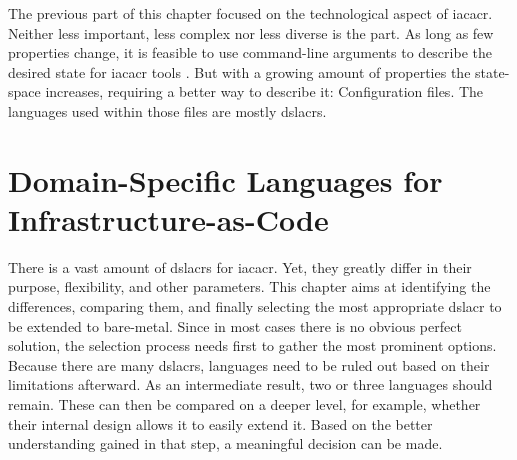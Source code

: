 \newline\smallskip
The previous part of this chapter focused on the technological  aspect of \gls{iacacr}. Neither less important, less complex nor less diverse is the  part.
\newline
As long as few properties change, it is feasible to use command-line arguments to describe the desired state for \gls{iacacr} tools \cite{iac_oreilly}. But with a growing amount of properties the state-space increases, requiring a better way to describe it: Configuration files. The languages used within those files are mostly \gls{dslacr}s.

\section{Domain-Specific Languages for Infrastructure-as-Code}
There is a vast amount of \gls{dslacr}s for \gls{iacacr}. Yet, they greatly differ in their purpose, flexibility, and other parameters. This chapter aims at identifying the differences, comparing them, and finally selecting the most appropriate \gls{dslacr} to be extended to bare-metal.
\newline
Since in most cases there is no obvious perfect solution, the selection process needs first to gather the most prominent options. Because there are many \gls{dslacr}s, languages need to be ruled out based on their limitations afterward. As an intermediate result, two or three languages should remain. These can then be compared on a deeper level, for example, whether their internal design allows it to easily extend it. Based on the better understanding gained in that step, a meaningful decision can be made.


